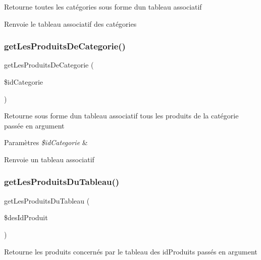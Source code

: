 Retourne toutes les catégories sous forme d\textquotesingle{}un tableau associatif

\begin{DoxyReturn}{Renvoie}
le tableau associatif des catégories 
\end{DoxyReturn}
\mbox{\label{class_pdo_vanille_a89d69a70c672e0962deab06c8fd9d9dc}} 
\subsubsection{\texorpdfstring{get\+Les\+Produits\+De\+Categorie()}{getLesProduitsDeCategorie()}}
{\footnotesize\ttfamily get\+Les\+Produits\+De\+Categorie (\begin{DoxyParamCaption}\item[{}]{\$id\+Categorie }\end{DoxyParamCaption})}

Retourne sous forme d\textquotesingle{}un tableau associatif tous les produits de la catégorie passée en argument


\begin{DoxyParams}{Paramètres}
{\em \$id\+Categorie} & \\
\hline
\end{DoxyParams}
\begin{DoxyReturn}{Renvoie}
un tableau associatif 
\end{DoxyReturn}
\mbox{\label{class_pdo_vanille_af8395c02ee51ef22a209dbe6759b2451}} 
\subsubsection{\texorpdfstring{get\+Les\+Produits\+Du\+Tableau()}{getLesProduitsDuTableau()}}
{\footnotesize\ttfamily get\+Les\+Produits\+Du\+Tableau (\begin{DoxyParamCaption}\item[{}]{\$des\+Id\+Produit }\end{DoxyParamCaption})}

Retourne les produits concernés par le tableau des id\+Produits passés en argument


